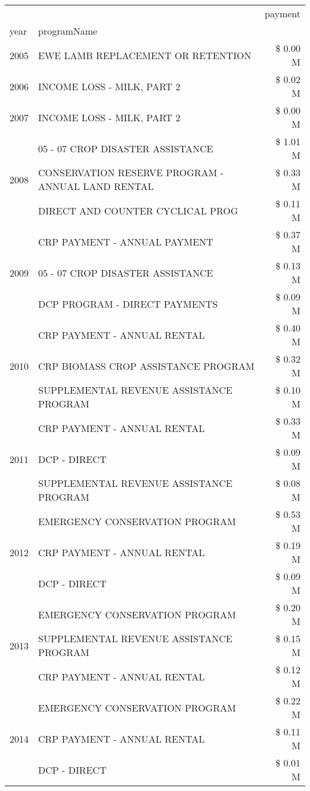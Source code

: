 \begin{tabular}{llr}
\toprule
 &  & payment \\
year & programName &  \\
\midrule
2005 & EWE LAMB REPLACEMENT OR RETENTION & \$ 0.00 M \\
\cline{1-3}
2006 & INCOME LOSS - MILK, PART 2 & \$ 0.02 M \\
\cline{1-3}
2007 & INCOME LOSS - MILK, PART 2 & \$ 0.00 M \\
\cline{1-3}
\multirow[t]{3}{*}{2008} & 05 - 07 CROP DISASTER ASSISTANCE & \$ 1.01 M \\
 & CONSERVATION RESERVE PROGRAM - ANNUAL LAND RENTAL & \$ 0.33 M \\
 & DIRECT AND COUNTER CYCLICAL PROG & \$ 0.11 M \\
\cline{1-3}
\multirow[t]{3}{*}{2009} & CRP PAYMENT - ANNUAL PAYMENT & \$ 0.37 M \\
 & 05 - 07 CROP DISASTER ASSISTANCE & \$ 0.13 M \\
 & DCP PROGRAM - DIRECT PAYMENTS & \$ 0.09 M \\
\cline{1-3}
\multirow[t]{3}{*}{2010} & CRP PAYMENT - ANNUAL RENTAL & \$ 0.40 M \\
 & CRP BIOMASS CROP ASSISTANCE PROGRAM & \$ 0.32 M \\
 & SUPPLEMENTAL REVENUE ASSISTANCE PROGRAM & \$ 0.10 M \\
\cline{1-3}
\multirow[t]{3}{*}{2011} & CRP PAYMENT - ANNUAL RENTAL & \$ 0.33 M \\
 & DCP - DIRECT & \$ 0.09 M \\
 & SUPPLEMENTAL REVENUE ASSISTANCE PROGRAM & \$ 0.08 M \\
\cline{1-3}
\multirow[t]{3}{*}{2012} & EMERGENCY CONSERVATION PROGRAM & \$ 0.53 M \\
 & CRP PAYMENT - ANNUAL RENTAL & \$ 0.19 M \\
 & DCP - DIRECT & \$ 0.09 M \\
\cline{1-3}
\multirow[t]{3}{*}{2013} & EMERGENCY CONSERVATION PROGRAM & \$ 0.20 M \\
 & SUPPLEMENTAL REVENUE ASSISTANCE PROGRAM & \$ 0.15 M \\
 & CRP PAYMENT - ANNUAL RENTAL & \$ 0.12 M \\
\cline{1-3}
\multirow[t]{3}{*}{2014} & EMERGENCY CONSERVATION PROGRAM & \$ 0.22 M \\
 & CRP PAYMENT - ANNUAL RENTAL & \$ 0.11 M \\
 & DCP - DIRECT & \$ 0.01 M \\

\end{tabular}
